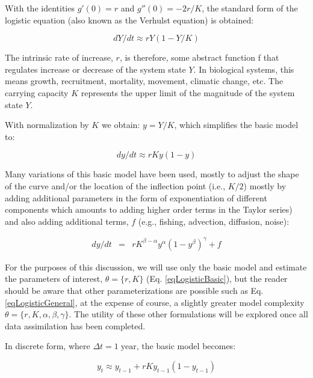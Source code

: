 \documentclass[letterpaper,portrait,11pt]{scrartcl}
\numberwithin{equation}{section}		%
\numberwithin{figure}{section}			%
\numberwithin{table}{section}				%
\begin{document}
With the identities $g'(0) = r$  and $g''(0) = - 2r/K$, the standard form of the logistic equation (also known as the Verhulst equation) is obtained:

\begin{equation} 
\label{eqLogistic}
dY/dt \approx r Y (1 - Y/K)
\end{equation}

The intrinsic rate of increase, $r$, is therefore, some abstract function f that regulates increase or decrease of the system state $Y$. In biological systems, this means growth, recruitment, mortality,  movement, climatic change, etc. The carrying capacity $K$ represents the upper limit of the magnitude of the system state $Y$.

With normalization by $K$ we obtain: $ y = Y/K $, which simplifies the basic model to:

\begin{equation} 
\label{eqLogisticBasic}
dy/dt  \approx  r K y (1 - y)
\end{equation}

Many variations of this basic model have been used, mostly to adjust the shape of the curve and/or the location of the inflection point (i.e., $K/2$) mostly by adding additional parameters in the form of exponentiation of different components which amounts to adding higher order terms in the Taylor series) and also adding additional terms, $f$ (e.g., fishing, advection, diffusion, noise): 

\begin{eqnarray} 
\label{eqLogisticGeneral}
dy / dt &=& rK^{\beta-\alpha} y^{\alpha} ( 1 - y^{\beta} )^{\gamma} + f 
\end{eqnarray}

For the purposes of this discussion, we will use only the basic model and estimate the parameters of interest, $\theta = \{r, K \}$ (Eq. \ref{eqLogisticBasic}), but the reader should be aware that other parameterizations are possible such as Eq. \ref{eqLogisticGeneral}, at the expense of course, a slightly greater model complexity $\theta=\{r,K,\alpha,\beta,\gamma\}$. The utility of these other formulations will be explored once all data assimilation has been completed. 

In discrete form, where $\Delta t = 1 \; \text{year}$, the basic model becomes:

\begin{equation} 
\label{eqLogisticDiscrete}
y_t  \approx y_{t-1} + r K y_{t-1} (1 - y_{t-1} )
\end{equation}
\end{document}
